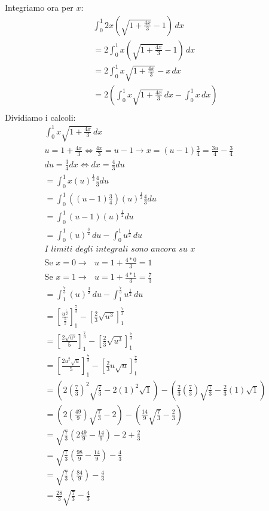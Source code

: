\documentclass{article}
\begin{document}
Integriamo ora per $x$:
\begin{align*}
    \int_0^{1} 2x(\sqrt{1+\frac{4x}{3}}-1)\,dx \\
    =2\int_0^{1} x(\sqrt{1+\frac{4x}{3}}-1)\,dx \\
    =2\int_0^{1} x\sqrt{1+\frac{4x}{3}}-x\,dx \\
    =2(\int_0^{1} x\sqrt{1+\frac{4x}{3}}\,dx-\int_0^{1} x\,dx) \\
\end{align*}
Dividiamo i calcoli:
\begin{align*}
    \int_0^{1} x\sqrt{1+\frac{4x}{3}}\,dx \\
    u=1+\frac{4x}{3} \iff \frac{4x}{3}=u-1 \to x=(u-1)\frac{3}{4}=\frac{3u}{4}-\frac{3}{4}\\
    du=\frac{3}{4}dx \iff dx=\frac{4}{3}du \\
    =\int_0^{1} x(u)^{\frac{1}{2}} \frac{4}{3}du \\
    =\int_0^{1} ((u-1)\frac{3}{4})(u)^{\frac{1}{2}} \frac{4}{3}du \\
    =\int_0^{1} (u-1)(u)^{\frac{1}{2}} du \\
    =\int_0^{1} (u)^{\frac{3}{2}} \,du -\int_0^{1} u^{\frac{1}{2}}\,du\\
    \textit{I limiti degli integrali sono ancora su $x$} \\
    \text{Se $x=0 \to$ } u=1+\frac{4*0}{3}=1 \\
    \text{Se $x=1 \to$ } u=1+\frac{4*1}{3}=\frac{7}{3}\\
    =\int_{1}^{\frac{7}{3}} (u)^{\frac{3}{2}} \,du -\int_{1}^{\frac{7}{3}}u^{\frac{1}{2}}\,du\\
    =[\frac{u^{\frac{5}{2}}}{\frac{5}{2}}]_{1}^{\frac{7}{3}} - [\frac{2}{3}\sqrt{u^3}]_{1}^{\frac{7}{3}} \\
    =[\frac{2\sqrt{u^5}}{5}]_{1}^{\frac{7}{3}}- [\frac{2}{3}\sqrt{u^3}]_{1}^{\frac{7}{3}} \\
    =[\frac{2u^2\sqrt{u}}{5}]_{1}^{\frac{7}{3}}- [\frac{2}{3}u\sqrt{u}]_{1}^{\frac{7}{3}} \\
    = (2(\frac{7}{3})^2 \sqrt{\frac{7}{3}} - 2(1)^2\sqrt{1} ) - (\frac{2}{3}(\frac{7}{3})\sqrt{\frac{7}{3}} - \frac{2}{3}(1)\sqrt{1}) \\
    = (2(\frac{49}{9})\sqrt{\frac{7}{3}} -2)-(\frac{14}{9}\sqrt{\frac{7}{3}} -\frac{2}{3}) \\
    = \sqrt{\frac{7}{3}}(2\frac{49}{9} - \frac{14}{9})-2+\frac{2}{3} \\
    = \sqrt{\frac{7}{3}}(\frac{98}{9} - \frac{14}{9})-\frac{4}{3} \\
    = \sqrt{\frac{7}{3}}(\frac{84}{9} )-\frac{4}{3} \\
    = \frac{28}{3} \sqrt{\frac{7}{3}}-\frac{4}{3} \\
\end{align*}
\end{document}
